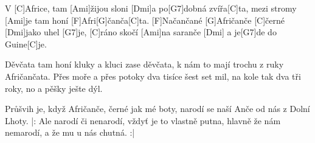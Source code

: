 
\sloka
V [C]Africe, tam [Ami]žijou sloni [Dmi]a po[G7]dobná zvířa[C]ta,
mezi stromy [Ami]je tam honí [F]Afri[G]čanča[C]ta.
[F]Načančané [G]Afričanče [C]černé [Dmi]jako uhel [G7]je,
[C]ráno skočí [Ami]na saranče [Dmi] a je[G7]de do Guine[C]je.

\sloka
Děvčata tam honí kluky a kluci zase děvčata,
k nám to mají trochu z ruky Afričančata.
Přes moře a přes potoky dva tisíce šest set mil,
na kole tak dva tři roky, no a pěšky ješte dýl.

\sloka
Průšvih je, když Afričanče, černé jak mé boty,
narodí se naší Anče od nás z Dolní Lhoty.
|: Ale narodí či nenarodí, vždyť je to vlastně putna,
hlavně že nám nemarodí, a že mu u nás chutná. :|

